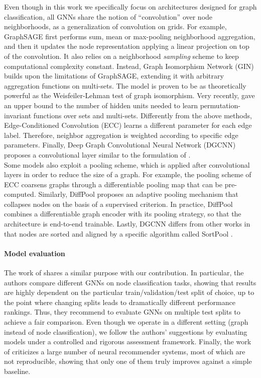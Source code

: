 \documentclass{article}
\newcommand{\quotes}[1]{``#1''}
\begin{document}
Even though in this work we specifically focus on architectures designed for graph classification, all GNNs share the notion of \quotes{convolution} over node neighborhoods, as a generalization of convolution on grids. For example, GraphSAGE \citep{graphsage} first performs sum, mean or max-pooling neighborhood aggregation, and then it updates the node representation applying a linear projection on top of the convolution. It also relies on a neighborhood \textit{sampling} scheme to keep computational complexity constant. Instead, Graph Isomorphism Network (GIN) \citep{how-powerful-gnn} builds upon the limitations of GraphSAGE, extending it with arbitrary aggregation functions on multi-sets. The model is proven to be as theoretically powerful as the Weisfeiler-Lehman test of graph isomorphism. Very recently, \citet{limitations-functions-sets} gave an upper bound to the number of hidden units needed to learn permutation-invariant functions over sets and multi-sets. 
Differently from the above methods, Edge-Conditioned Convolution (ECC) \citep{ecc} learns a different parameter for each edge label. Therefore, neighbor aggregation is weighted according to specific edge parameters.
Finally, Deep Graph Convolutional Neural Network (DGCNN) \citep{dgcnn} proposes a convolutional layer similar to the formulation of \cite{gcn}. \\
Some models also exploit a pooling scheme, which is applied after convolutional layers in order to reduce the size of a graph. For example, the pooling scheme of ECC coarsens graphs through a differentiable pooling map that can be pre-computed. Similarly, DiffPool \citep{diffpool} proposes an adaptive pooling mechanism that collapses nodes on the basis of a supervised criterion. In practice, DiffPool combines a differentiable graph encoder with its pooling strategy, so that the architecture is end-to-end trainable. Lastly, DGCNN differs from other works in that nodes are sorted and aligned by a specific algorithm called SortPool \citep{dgcnn}. 

\paragraph{Model evaluation} The work of \cite{pitfalls-gnn-evaluation} shares a similar purpose with our contribution. In particular, the authors compare different GNNs on node classification tasks, showing that results are highly dependent on the particular train/validation/test split of choice, up to the point where changing splits leads to dramatically different performance rankings. Thus, they recommend to evaluate GNNs on multiple test splits to achieve a fair comparison. Even though we operate in a different setting (graph instead of node classification), we follow the authors' suggestions by evaluating models under a controlled and rigorous assessment framework. Finally, the work of \citet{are-we-really-making-progress} criticizes a large number of neural recommender systems, most of which are not reproducible, showing that only one of them truly improves against a simple baseline.
\end{document}
